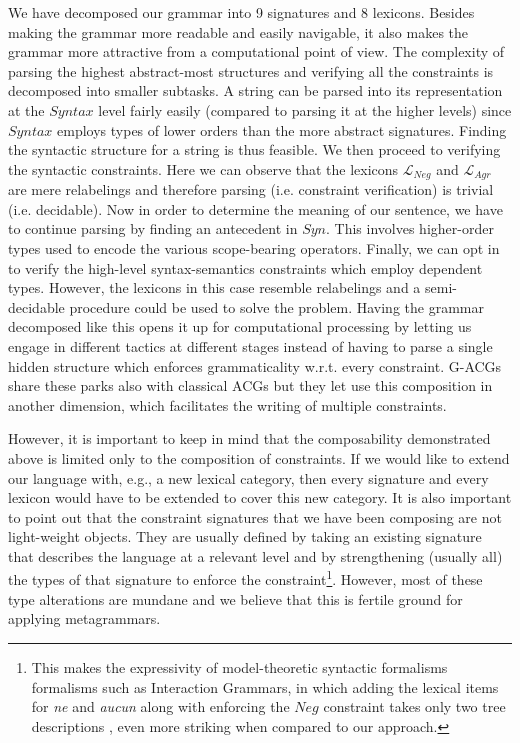 \documentclass{llncs}
\begin{document}
We have decomposed our grammar into 9 signatures and 8 lexicons. Besides
making the grammar more readable and easily navigable, it also makes the
grammar more attractive from a computational point of view. The complexity of
parsing the highest abstract-most structures and verifying all the constraints
is decomposed into smaller subtasks. A string can be parsed into its
representation at the $Syntax$ level fairly easily (compared to parsing it at
the higher levels) since $Syntax$ employs types of lower orders than the more
abstract signatures. Finding the syntactic structure for a string is thus
feasible. We then proceed to verifying the syntactic constraints. Here we can
observe that the lexicons $\mathcal{L}_{Neg}$ and $\mathcal{L}_{Agr}$ are mere
relabelings and therefore parsing (i.e. constraint verification) is trivial
(i.e. decidable). Now in order to determine the meaning of our sentence, we
have to continue parsing by finding an antecedent in $Syn$. This involves
higher-order types used to encode the various scope-bearing
operators. Finally, we can opt in to verify the high-level syntax-semantics
constraints which employ dependent types. However, the lexicons in this case
resemble relabelings and a semi-decidable procedure could be used to solve the
problem. Having the grammar decomposed like this opens it up for computational
processing by letting us engage in different tactics at different stages
instead of having to parse a single hidden structure which enforces
grammaticality w.r.t. every constraint. G-ACGs share these parks also with
classical ACGs but they let use this composition in another dimension, which
facilitates the writing of multiple constraints.

However, it is important to keep in mind that the composability demonstrated
above is limited only to the composition of constraints. If we would like to
extend our language with, e.g., a new lexical category, then every signature
and every lexicon would have to be extended to cover this new category. It is
also important to point out that the constraint signatures that we have been
composing are not light-weight objects. They are usually defined by taking an
existing signature that describes the language at a relevant level and by
strengthening (usually all) the types of that signature to enforce the
constraint\footnote{This makes the expressivity of model-theoretic syntactic
  formalisms formalisms such as Interaction Grammars, in which adding the
  lexical items for \emph{ne} and \emph{aucun} along with enforcing the $Neg$
  constraint takes only two tree descriptions \cite{perrier2007french}, even
  more striking when compared to our approach.}. However, most of these type
alterations are mundane and we believe that this is fertile ground for
applying metagrammars.
\end{document}
